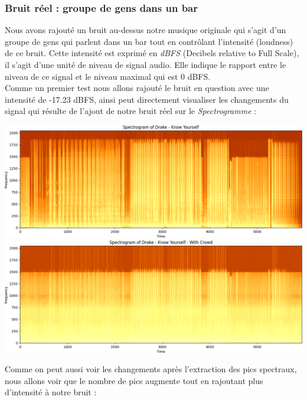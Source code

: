\documentclass[11pt, report, french]{scrreprt}
\begin{document}
\subsubsection{Bruit réel : groupe de gens dans un bar}
Nous avons rajouté un bruit au-dessus notre musique originale qui s'agit d'un groupe de gens qui parlent dans un bar tout en contrôlant l'intensité (loudness) de ce bruit.
Cette intensité est exprimé en \textit{dBFS} (Decibels relative to Full Scale), il s'agit d'une unité de niveau de signal audio. Elle indique le rapport entre le niveau de ce signal et le niveau maximal qui est 0 dBFS.\\
Comme un premier test nous allons rajouté le bruit en question avec une intensité de -17.23 dBFS, ainsi peut directement visualiser les changements du signal qui résulte de l'ajout de notre bruit réel sur le \textit{Spectrogramme} :

\begin{center}
	\includegraphics[scale=0.535]{img/spectrogram_drake.png}\vspace{1cm}
	\includegraphics[scale=0.535]{img/spec_drake_crowd.png}
\end{center}


Comme on peut aussi voir les changements après l'extraction des pics spectraux, nous allons voir que le nombre de pics augmente tout en rajoutant plus d'intensité à notre bruit :
\end{document}
